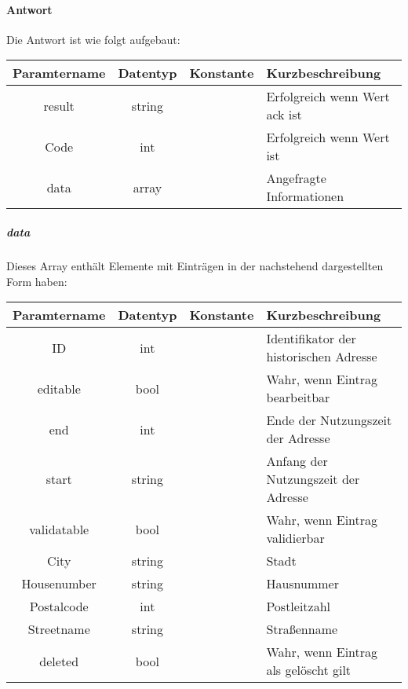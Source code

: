 \paragraph{Antwort}Die Antwort ist wie folgt aufgebaut:
\begin{table}[H]
	\begin{tabular}{|c|c|c|p{6.5cm}|}
		\hline
		\textbf{Paramtername} & \textbf{Datentyp} & \textbf{Konstante} & \textbf{Kurzbeschreibung}                                                                                               \\ \hline
		result              & string           &                 & Erfolgreich wenn Wert {\glqq ack\grqq} ist \\ \hline
		Code                & int              &                 & Erfolgreich wenn Wert {\glqq 0\grqq} ist \\ \hline
		data                & array            &                 & Angefragte Informationen \\ \hline
	\end{tabular}
\end{table}
\subparagraph{data}Dieses Array enthält Elemente mit Einträgen in der nachstehend dargestellten Form haben:
\begin{table}[H]
	\begin{tabular}{|c|c|c|p{6.5cm}|}
		\hline
		\textbf{Paramtername} & \textbf{Datentyp} & \textbf{Konstante} & \textbf{Kurzbeschreibung}    \\ \hline
		ID                     & int             &                 & Identifikator der historischen Adresse \\ \hline
		editable               & bool            &                 & Wahr, wenn Eintrag bearbeitbar \\ \hline
		end                    & int             &                 & Ende der Nutzungszeit der Adresse \\ \hline
		start                  & string          &                 & Anfang der Nutzungszeit der Adresse \\ \hline
		validatable            & bool            &                 & Wahr, wenn Eintrag validierbar \\ \hline
		City                   & string          &                 & Stadt \\ \hline
		Housenumber            & string          &                 & Hausnummer \\ \hline
		Postalcode             & int             &                 & Postleitzahl \\ \hline
		Streetname             & string          &                 & Straßenname \\ \hline
		deleted                & bool            &                 & Wahr, wenn Eintrag als gelöscht gilt \\ \hline
	\end{tabular}
\end{table}


